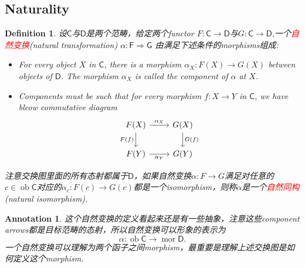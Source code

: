 \documentclass{article}
\newtheorem{definition}[theorem]{Definition}
\newtheorem{annotation}[theorem]{Annotation}
\newcommand*{\cat}[1]{\textsf{#1}\xspace}
\DeclareMathOperator{\ob}{ob}
\DeclareMathOperator{\mor}{mor}
\newcommand{\redt}[1]{\textcolor{red}{#1}}
\begin{document}
\newpage
\subsection{Naturality}
\begin{definition}
\rm 设$\cat{C}$与$\cat{D}$是两个范畴，给定两个functor $F \colon \cat{C}\rightarrow \cat{D}$与$G \colon \cat{C} \rightarrow \cat{D}$,一个\redt{自然变换}(natural transformation) $\alpha:\cat{F} \Rightarrow \cat{G}$ 由满足下述条件的morphisms组成:
\begin{itemize}
	\item For every object $X$ in $\cat{C}$, there is a morphism $\alpha_X: F(X) \to G(X)$ between objects of $\cat{D}$. The morphism $\alpha_X$ is called the component of $\alpha$ at $X$. 
	\item Components must be such that for every morphism $f:X \to Y$ in $\cat{C}$, we have bleow commutative diagram
	$$
\begin{tikzcd}
F(X) \arrow[r, "\alpha_X"] \arrow[d, "F(f)"'] & G(X) \arrow[d, "G(f)"] \\
F(Y) \arrow[r, "\alpha_Y"']                & G(Y)             
\end{tikzcd}
$$ 
\end{itemize}

注意交换图里面的所有态射都属于$\cat{D}$，如果自然变换$\alpha \colon F \rightarrow G$满足对任意的$c \in \ob\cat{C}$对应的$\alpha_{c} : F(c) \to G(c)$都是一个isomorphism，则称$\alpha$是一个\redt{自然同构}(natural isomorphism). 
\end{definition}

\begin{annotation}
\rm 这个自然变换的定义看起来还是有一些抽象，注意这些component arrows都是目标范畴的态射，所以自然变换可以形象的表示为
$$
\alpha \colon \ob\cat{C} \rightarrow \mor\cat{D}. 
$$
一个自然变换可以理解为两个函子之间morphism，最重要是理解上述交换图是如何定义这个morphism. 
\end{annotation}
\end{document}
